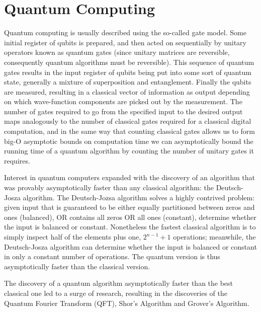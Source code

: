 \section{Quantum Computing}
Quantum computing is usually described using the so-called gate model.\cite{qc}  Some initial register of qubits is prepared, and then acted on sequentially by unitary operators known as quantum gates (since unitary matrices are reversible, consequently quantum algorithms must be reversible).  This sequence of quantum gates results in the input register of qubits being put into some sort of quantum state, generally a mixture of superposition and entanglement.  Finally the qubits are measured, resulting in a classical vector of information as output depending on which wave-function components are picked out by the measurement.  The number of gates required to go from the specified input to the desired output maps analogously to the number of classical gates required for a classical digital computation, and in the same way that counting classical gates allows us to form big-O asymptotic bounds on computation time we can asymptotically bound the running time of a quantum algorithm by counting the number of unitary gates it requires.

Interest in quantum computers expanded with the discovery of an algorithm that was provably asymptotically faster than any classical algorithm: the Deutsch-Josza algorithm.\cite{deutsch}  The Deutsch-Jozsa algorithm solves a highly contrived problem: given input that is guaranteed to be either equally partitioned between zeros and ones (balanced), OR contains all zeros OR all ones (constant), determine whether the input is balanced or constant.  Nonetheless the fastest classical algorithm is to simply inspect half of the elements plus one, $2^{n-1} + 1$ operations; meanwhile, the Deutsch-Josza algorithm can determine whether the input is balanced or constant in only a constant number of operations.  The quantum version is thus asymptotically faster than the classical version.

The discovery of a quantum algorithm asymptotically faster than the best classical one led to a surge of research, resulting in the discoveries of the Quantum Fourier Transform (QFT)\cite{qcbook}, Shor's\cite{shor} Algorithm and Grover's Algorithm\cite{grover}.

